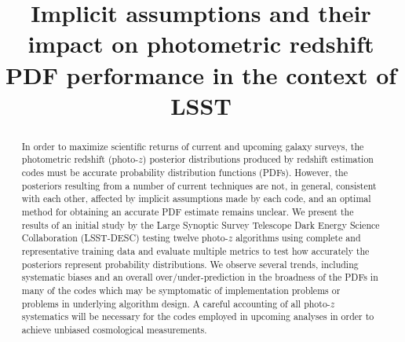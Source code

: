 \documentclass[\docopts]{\docclass}
\begin{document}
\linenumbers

\title{Implicit assumptions and their impact on photometric redshift PDF performance in the context of LSST}

\maketitlepre

\begin{abstract}

In order to maximize scientific returns of current and upcoming galaxy surveys, the photometric redshift (photo-$z$) posterior distributions produced by redshift estimation codes must be accurate probability distribution functions (PDFs).  However, the posteriors resulting from a number of current techniques are not, in general, consistent with each other, affected by implicit assumptions made by each code, and an optimal method for obtaining an accurate PDF estimate remains unclear.   We present the results of an initial study by the Large Synoptic Survey Telescope Dark Energy Science Collaboration (\textsc{LSST-DESC}) testing twelve photo-$z$ algorithms using complete and representative training data and evaluate multiple metrics to test how accurately the posteriors represent probability distributions.  We observe several trends, including systematic biases and an overall over/under-prediction in the broadness of the PDFs in many of the codes which may be symptomatic of implementation problems or problems in underlying algorithm design.  A careful accounting of all photo-$z$ systematics will be necessary for the codes employed in upcoming analyses in order to achieve unbiased cosmological measurements.
  

\end{abstract}
\end{document}
